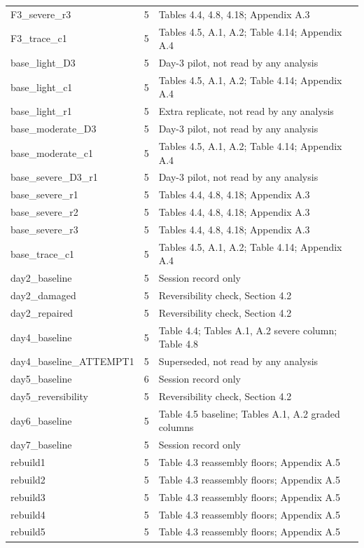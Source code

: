 \begin{longtable}{@{}l r >{\raggedright\arraybackslash}p{}@{}}
F3\_severe\_r3 & 5 & Tables 4.4, 4.8, 4.18; Appendix A.3 \\
F3\_trace\_c1 & 5 & Tables 4.5, A.1, A.2; Table 4.14; Appendix A.4 \\
base\_light\_D3 & 5 & Day-3 pilot, not read by any analysis \\
base\_light\_c1 & 5 & Tables 4.5, A.1, A.2; Table 4.14; Appendix A.4 \\
base\_light\_r1 & 5 & Extra replicate, not read by any analysis \\
base\_moderate\_D3 & 5 & Day-3 pilot, not read by any analysis \\
base\_moderate\_c1 & 5 & Tables 4.5, A.1, A.2; Table 4.14; Appendix A.4 \\
base\_severe\_D3\_r1 & 5 & Day-3 pilot, not read by any analysis \\
base\_severe\_r1 & 5 & Tables 4.4, 4.8, 4.18; Appendix A.3 \\
base\_severe\_r2 & 5 & Tables 4.4, 4.8, 4.18; Appendix A.3 \\
base\_severe\_r3 & 5 & Tables 4.4, 4.8, 4.18; Appendix A.3 \\
base\_trace\_c1 & 5 & Tables 4.5, A.1, A.2; Table 4.14; Appendix A.4 \\
day2\_baseline & 5 & Session record only \\
day2\_damaged & 5 & Reversibility check, Section 4.2 \\
day2\_repaired & 5 & Reversibility check, Section 4.2 \\
day4\_baseline & 5 & Table 4.4; Tables A.1, A.2 severe column; Table 4.8 \\
day4\_baseline\_ATTEMPT1 & 5 & Superseded, not read by any analysis \\
day5\_baseline & 6 & Session record only \\
day5\_reversibility & 5 & Reversibility check, Section 4.2 \\
day6\_baseline & 5 & Table 4.5 baseline; Tables A.1, A.2 graded columns \\
day7\_baseline & 5 & Session record only \\
rebuild1 & 5 & Table 4.3 reassembly floors; Appendix A.5 \\
rebuild2 & 5 & Table 4.3 reassembly floors; Appendix A.5 \\
rebuild3 & 5 & Table 4.3 reassembly floors; Appendix A.5 \\
rebuild4 & 5 & Table 4.3 reassembly floors; Appendix A.5 \\
rebuild5 & 5 & Table 4.3 reassembly floors; Appendix A.5 \\

\end{longtable}
